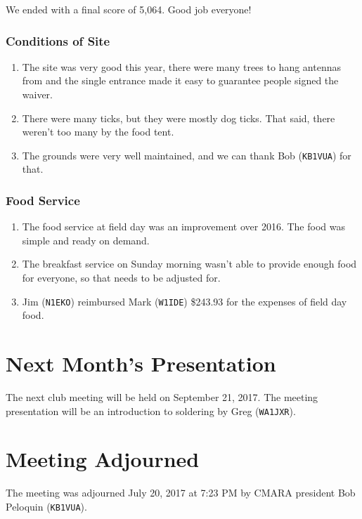 \documentclass[10pt,letterpaper]{article}
\begin{document}
\noindent
We ended with a final score of 5,064. Good job everyone!

\subsubsection{Conditions of Site}
\begin{enumerate}
\item The site was very good this year, there were many trees to hang antennas from and the single entrance made it easy to guarantee people signed the waiver.
\item There were many ticks, but they were mostly dog ticks. That said, there weren't too many by the food tent.
\item The grounds were very well maintained, and we can thank Bob (\texttt{KB1VUA}) for that.
\end{enumerate}

\subsubsection{Food Service}
\begin{enumerate}
\item The food service at field day was an improvement over 2016. The food was simple and ready on demand.
\item The breakfast service on Sunday morning wasn't able to provide enough food for everyone, so that needs to be adjusted for.
\item Jim (\texttt{N1EKO}) reimbursed Mark (\texttt{W1IDE}) \$243.93 for the expenses of field day food.
\end{enumerate}

\section{Next Month's Presentation}
The next club meeting will be held on September 21, 2017. The meeting presentation will be an introduction to soldering by Greg (\texttt{WA1JXR}).

\section{Meeting Adjourned}
The meeting was adjourned July 20, 2017 at 7:23 PM by CMARA president Bob Peloquin (\texttt{KB1VUA}).
\end{document}
